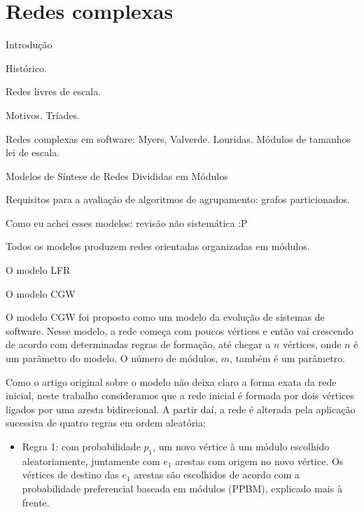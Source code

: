 
\chapter{Redes complexas}

\begin{section}{Introdução}

Histórico.

Redes livres de escala.

Motivos. Tríades.

Redes complexas em software:
 Myers, Valverde.
 Louridas. Módulos de tamanhos lei de escala.

\end{section}

\begin{section}{Modelos de Síntese de Redes Divididas em Módulos}

Requisitos para a avaliação de algoritmos de agrupamento: grafos particionados.

Como eu achei esses modelos: revisão não sistemática :P


Todos os modelos produzem redes orientadas organizadas em módulos.

\begin{subsection}{O modelo LFR}


\end{subsection}

\begin{subsection}{O modelo CGW}

O modelo CGW \cite{Chen2008} foi proposto como um modelo da evolução de sistemas de software. Nesse modelo, a rede começa com poucos vértices e então vai crescendo de acordo com determinadas regras de formação, até chegar a $n$ vértices, onde $n$ é um parâmetro do modelo. O número de módulos, $m$, também é um parâmetro. 

Como o artigo original sobre o modelo não deixa claro a forma exata da rede inicial, neste trabalho consideramos que a rede inicial é formada por dois vértices ligados por uma aresta bidirecional. A partir daí, a rede é alterada pela aplicação sucessiva de quatro regras em ordem aleatória:

\begin{itemize}
	
	\item Regra 1: com probabilidade $p_1$, um novo vértice à um módulo escolhido aleatoriamente, juntamente com $e_1$ arestas com origem no novo vértice. Os vértices de destino das $e_1$ arestas são escolhidos de acordo com a probabilidade preferencial baseada em módulos (PPBM), explicado mais à frente.
	

\end{itemize}
\end{subsection}
\end{section}
